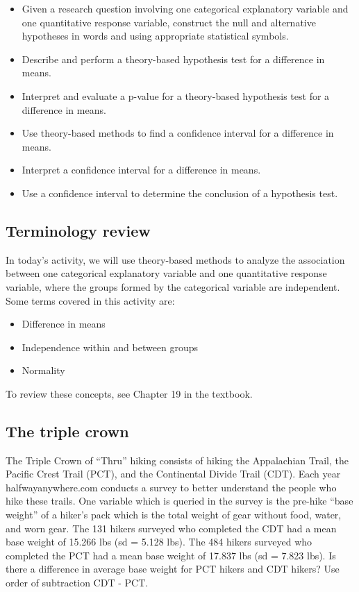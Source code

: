 \documentclass[
]{report}
\begin{document}
\begin{itemize}
\item
  Given a research question involving one categorical explanatory variable and one quantitative response variable, construct the null and alternative hypotheses
  in words and using appropriate statistical symbols.
\item
  Describe and perform a theory-based hypothesis test for a difference in means.
\item
  Interpret and evaluate a p-value for a theory-based hypothesis test for a difference in means.
\item
  Use theory-based methods to find a confidence interval for a difference in means.
\item
  Interpret a confidence interval for a difference in means.
\item
  Use a confidence interval to determine the conclusion of a hypothesis test.
\end{itemize}

\hypertarget{terminology-review-22}{%
\subsection{Terminology review}\label{terminology-review-22}}

In today's activity, we will use theory-based methods to analyze the association between one categorical explanatory variable and one quantitative response variable, where the groups formed by the categorical variable are independent. Some terms covered in this activity are:

\begin{itemize}
\item
  Difference in means
\item
  Independence within and between groups
\item
  Normality
\end{itemize}

To review these concepts, see Chapter 19 in the textbook.

\hypertarget{the-triple-crown}{%
\subsection{The triple crown}\label{the-triple-crown}}

The Triple Crown of ``Thru'' hiking consists of hiking the Appalachian Trail, the Pacific Crest Trail (PCT), and the Continental Divide Trail (CDT). Each year halfwayanywhere.com conducts a survey to better understand the people who hike these trails. One variable which is queried in the survey is the pre-hike ``base weight'' of a hiker's pack which is the total weight of gear without food, water, and worn gear. The 131 hikers surveyed who completed the CDT had a mean base weight of 15.266 lbs (sd = 5.128 lbs). The 484 hikers surveyed who completed the PCT had a mean base weight of 17.837 lbs (sd = 7.823 lbs). Is there a difference in average base weight for PCT hikers and CDT hikers? Use order of subtraction CDT - PCT.
\end{document}
